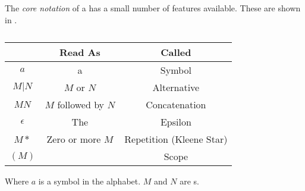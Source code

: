 \begin{definition}\label{def:Regex_Core_Notation}
  The \emph{core notation} of a  has a small number of features available.
  These are shown in .

  \begin{table}[h!]
    \centering
    \begin{tabular}{ccc}
      \toprule
      \nameref{def:Regular_Expression} & Read As & Called \\
      \midrule
      $a$ & a & Symbol \\
      $M \vert N$ & $M$ or $N$ & Alternative \\
      $MN$ & $M$ followed by $N$ & Concatenation \\
      $\epsilon$ & The \nameref{def:Empty_String} & Epsilon \\
      $M*$ & Zero or more $M$ & Repetition (Kleene Star) \\
      $(M)$ & & Scope \\
      \bottomrule
    \end{tabular}
    \caption{ }
    \label{tab:Regex_Core_Notation}
  \end{table}
  Where $a$ is a symbol in the alphabet.
  $M$ and $N$ are s.
\end{definition}

